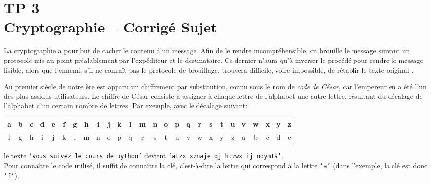 %
%

\chapter*{TP 3 \\
Cryptographie -- \ifprof Corrigé \else Sujet \fi}


\iflivret {} \else
\ifprof  {} \else \fi
\fi
\setcounter{question}{0}
La cryptographie a pour but de cacher le contenu d'un message. Afin de le rendre incompréhensible, on brouille le message suivant un protocole mis au point préalablement par l'expéditeur et le destinataire. Ce dernier n'aura qu'à inverser le procédé pour rendre le message lisible, alors que l'ennemi, s'il ne connaît pas le protocole de brouillage, trouvera difficile, voire impossible, de rétablir le texte original . 



Au premier siècle de notre ère est apparu un chiffrement par substitution, connu sous le nom de \emph{code de César}, car l'empereur en a été l'un des plus assidus utilisateurs. Le chiffre de César consiste à assigner à chaque lettre de l'alphabet une autre lettre, résultant du décalage de l'alphabet d'un certain nombre de lettres. Par exemple, avec le décalage suivant:
\begin{center}
\begin{tabular}{|*{26}{c|}}
\hline
a&b&c&d&e&f&g&h&i&j&k&l&m&n&o&p&q&r&s&t&u&v&w&x&y&z\\
\hline
f&g&h&i&j&k&l&m&n&o&p&q&r&s&t&u&v&w&x&y&z&a&b&c&d&e\\
\hline
\end{tabular}
\end{center}
le texte \texttt{'vous suivez le cours de python'} devient \texttt{'atzx xznaje qj htzwx ij udymts'}.\\ Pour connaître le code utilisé, il suffit de connaître la clé, c'est-à-dire la lettre qui correspond à la lettre \texttt{'a'} (dans l'exemple, la clé est donc \texttt{'f'}). 
\bigskip

